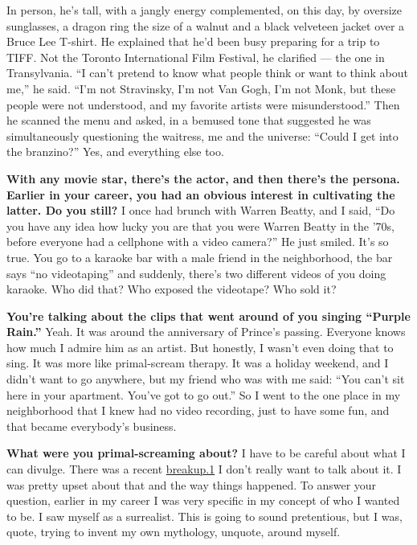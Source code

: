 In person, he's tall, with a jangly energy complemented, on this day, by
oversize sunglasses, a dragon ring the size of a walnut and a black
velveteen jacket over a Bruce Lee T-shirt. He explained that he'd been
busy preparing for a trip to TIFF. Not the Toronto International Film
Festival, he clarified --- the one in Transylvania. ``I can't pretend to
know what people think or want to think about me,'' he said. ``I'm not
Stravinsky, I'm not Van Gogh, I'm not Monk, but these people were not
understood, and my favorite artists were misunderstood.'' Then he
scanned the menu and asked, in a bemused tone that suggested he was
simultaneously questioning the waitress, me and the universe: ``Could I
get into the branzino?'' Yes, and everything else too.

\textbf{With any movie star, there's the actor, and then there's the
persona. Earlier in your career, you had an obvious interest in
cultivating the latter. Do you still?} I once had brunch with Warren
Beatty, and I said, ``Do you have any idea how lucky you are that you
were Warren Beatty in the '70s, before everyone had a cellphone with a
video camera?'' He just smiled. It's so true. You go to a karaoke bar
with a male friend in the neighborhood, the bar says ``no videotaping''
and suddenly, there's two different videos of you doing karaoke. Who did
that? Who exposed the videotape? Who sold it?

\textbf{You're talking about the clips that went around of you singing
``Purple Rain.''} Yeah. It was around the anniversary of Prince's
passing. Everyone knows how much I admire him as an artist. But
honestly, I wasn't even doing that to sing. It was more like
primal-scream therapy. It was a holiday weekend, and I didn't want to go
anywhere, but my friend who was with me said: ``You can't sit here in
your apartment. You've got to go out.'' So I went to the one place in my
neighborhood that I knew had no video recording, just to have some fun,
and that became everybody's business.

\textbf{What were you primal-screaming about?} I have to be careful
about what I can divulge. There was a recent
\href{http://nytimes3xbfgragh.onion\#tooltip-1}{breakup.1} I don't
really want to talk about it. I was pretty upset about that and the way
things happened. To answer your question, earlier in my career I was
very specific in my concept of who I wanted to be. I saw myself as a
surrealist. This is going to sound pretentious, but I was, quote, trying
to invent my own mythology, unquote, around myself.


